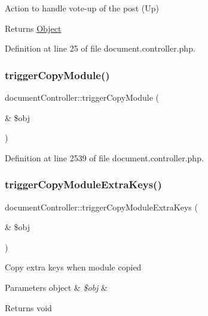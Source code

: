 Action to handle vote-\/up of the post (Up) \begin{DoxyReturn}{Returns}
\hyperlink{classObject}{Object} 
\end{DoxyReturn}


Definition at line 25 of file document.\+controller.\+php.

\hypertarget{classdocumentController_a612ee2c47ff03e76f6e86fa31ff098a7}{}\label{classdocumentController_a612ee2c47ff03e76f6e86fa31ff098a7} 
\subsubsection{\texorpdfstring{trigger\+Copy\+Module()}{triggerCopyModule()}}
{\footnotesize\ttfamily document\+Controller\+::trigger\+Copy\+Module (\begin{DoxyParamCaption}\item[{\&}]{\$obj }\end{DoxyParamCaption})}



Definition at line 2539 of file document.\+controller.\+php.

\hypertarget{classdocumentController_a5e03be29c7b61f87658b604ba80daa88}{}\label{classdocumentController_a5e03be29c7b61f87658b604ba80daa88} 
\subsubsection{\texorpdfstring{trigger\+Copy\+Module\+Extra\+Keys()}{triggerCopyModuleExtraKeys()}}
{\footnotesize\ttfamily document\+Controller\+::trigger\+Copy\+Module\+Extra\+Keys (\begin{DoxyParamCaption}\item[{\&}]{\$obj }\end{DoxyParamCaption})}

Copy extra keys when module copied 
\begin{DoxyParams}[1]{Parameters}
object & {\em \$obj} & \\
\hline
\end{DoxyParams}
\begin{DoxyReturn}{Returns}
void 
\end{DoxyReturn}


